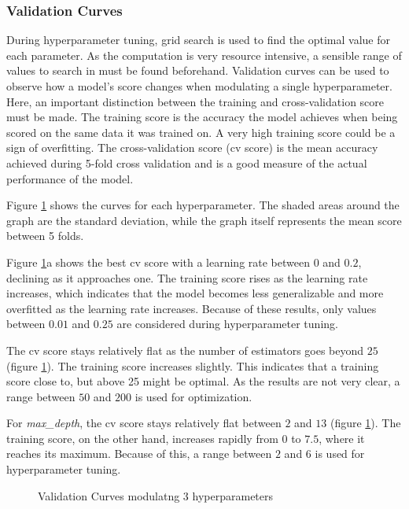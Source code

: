 \subsubsection{Validation Curves}

During hyperparameter tuning, grid search is used to find the optimal value for each parameter.
As the computation is very resource intensive, a sensible range of values to search in must be found beforehand.
Validation curves can be used to observe how a model's score changes when modulating a single hyperparameter.
Here, an important distinction between the training and cross-validation score must be made.
The training score is the accuracy the model achieves when being scored on the same data it was trained on.
A very high training score could be a sign of overfitting.
The cross-validation score (cv score) is the mean accuracy achieved during 5-fold cross validation and is a good measure
of the actual performance of the model.


Figure \ref{fig:Validation Curves modulating 3 hyperparameters} shows the curves for each hyperparameter. The shaded
areas around the graph are the standard deviation, while the graph itself represents the mean score between 5 folds.

Figure \ref{fig:Validation Curves modulating 3 hyperparameters}a shows the best cv score with a learning rate
between $0$ and $0.2$, declining as it approaches one.
The training score rises as the learning rate increases, which indicates that the model becomes less generalizable and
more overfitted as the learning rate increases.
Because of these results, only values between $0.01$ and $0.25$ are considered during hyperparameter tuning.

The cv score stays relatively flat as the number of estimators goes beyond $25$ (figure \ref{fig:Validation Curves modulating 3 hyperparameters}).
The training score increases slightly.
This indicates that a training score close to, but above 25 might be optimal. As the results are not very clear,
a range between $50$ and $200$ is used for optimization.

For \emph{max\_depth}, the cv score stays relatively flat between $2$ and $13$ (figure \ref{fig:Validation Curves modulating 3 hyperparameters}).
The training score, on the other hand, increases rapidly from $0$ to $7.5$, where it reaches its maximum.
Because of this, a range between $2$ and $6$ is used for hyperparameter tuning.

\begin{figure}[H]
    \centering
    \qquad
    \qquad
    \caption{Validation Curves modulatng 3 hyperparameters}%
    \label{fig:Validation Curves modulating 3 hyperparameters}%
\end{figure}

